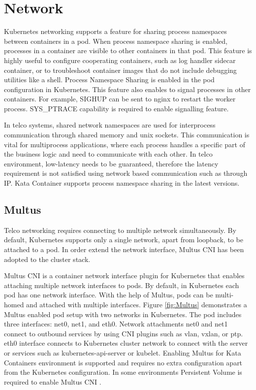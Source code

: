 
\section{Network}

Kubernetes networking supports a feature for sharing process namespaces between containers in a pod. When process namespace sharing is enabled, processes in a container are visible to other containers in that pod. This feature is highly useful to configure cooperating containers, such as log handler sidecar container, or to troubleshoot container images that do not include debugging utilities like a shell. Process Namespace Sharing is enabled in the pod configuration in Kubernetes. This feature also enables to signal processes in other containers. For example, SIGHUP can be sent to nginx to restart the worker process. SYS\_PTRACE capability is required to enable signalling feature. \cite{ShareProcessNamespaceKubernetes}

In telco systems, shared network namespaces are used for interprocess communication through shared memory and unix sockets. This communication is vital for multiprocess applications, where each process handles a specific part of the business logic and need to communicate with each other. In telco environment, low-latency needs to be guaranteed, therefore the latency requirement is not satisfied using network based communication such as through IP. Kata Container supports process namespace sharing in the latest versions.

\subsection{Multus}

Telco networking requires connecting to multiple network simultaneously. By default, Kubernetes supports only a single network, apart from loopback, to be attached to a pod. In order extend the network interface, Multus CNI has been adopted to the cluster stack.

Multus CNI \cite{Multus} is a container network interface plugin for Kubernetes that enables attaching multiple network interfaces to pods. By default, in Kubernetes each pod has one network interface. With the help of Multus, pods can be multi-homed and attached with multiple interfaces. Figure \ref{fig:Multus} demonstrates a Multus enabled pod setup with two networks in Kubernetes. The pod includes three interfaces: net0, net1, and eth0. Network attachments net0 and net1 connect to outbound services by using CNI plugins such as vlan, vxlan, or ptp. eth0 interface connects to Kubernetes cluster network to connect with the server or services such as kubernetes-api-server or kubelet. Enabling Multus for Kata Containers environment is supported and requires no extra configuration apart from the Kubernetes configuration. In some environments Persistent Volume is required to enable Multus CNI \cite{MultusUbuntu}.


